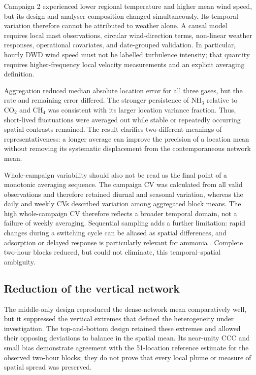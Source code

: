 \documentclass[12pt,a4paper]{article}
\begin{document}
Campaign 2 experienced lower regional temperature and higher mean wind speed,
but its design and analyser composition changed simultaneously. Its temporal
variation therefore cannot be attributed to weather alone. A causal model
requires local mast observations, circular wind-direction terms, non-linear
weather responses, operational covariates, and date-grouped validation. In
particular, hourly DWD wind speed must not be labelled turbulence intensity;
that quantity requires higher-frequency local velocity measurements and an
explicit averaging definition.

Aggregation reduced median absolute location error for all three gases, but
the rate and remaining error differed. The stronger persistence of
\(\mathrm{NH_3}\) relative to \(\mathrm{CO_2}\) and
\(\mathrm{CH_4}\) was consistent with its larger location variance fraction.
Thus, short-lived fluctuations were averaged out while stable or repeatedly
occurring spatial contrasts remained. The result clarifies two different
meanings of representativeness: a longer average can improve the precision of
a location mean without removing its systematic displacement from the
contemporaneous network mean.

Whole-campaign variability should also not be read as the final point of a
monotonic averaging sequence. The campaign CV was calculated from all valid
observations and therefore retained diurnal and seasonal variation, whereas
the daily and weekly CVs described variation among aggregated block means.
The high whole-campaign CV therefore reflects a broader temporal domain, not a
failure of weekly averaging. Sequential sampling adds a further limitation:
rapid changes during a switching cycle can be aliased as spatial differences,
and adsorption or delayed response is particularly relevant for ammonia
\citep{Rom2010}. Complete two-hour blocks reduced, but could not eliminate,
this temporal--spatial ambiguity.

\subsection{Reduction of the vertical network}

The middle-only design reproduced the dense-network mean comparatively well,
but it suppressed the vertical extremes that defined the heterogeneity under
investigation. The top-and-bottom design retained these extremes and allowed
their opposing deviations to balance in the spatial mean. Its near-unity CCC
and small bias demonstrate agreement with the 51-location reference estimate
for the observed two-hour blocks; they do not prove that every local plume or
measure of spatial spread was preserved.
\end{document}
